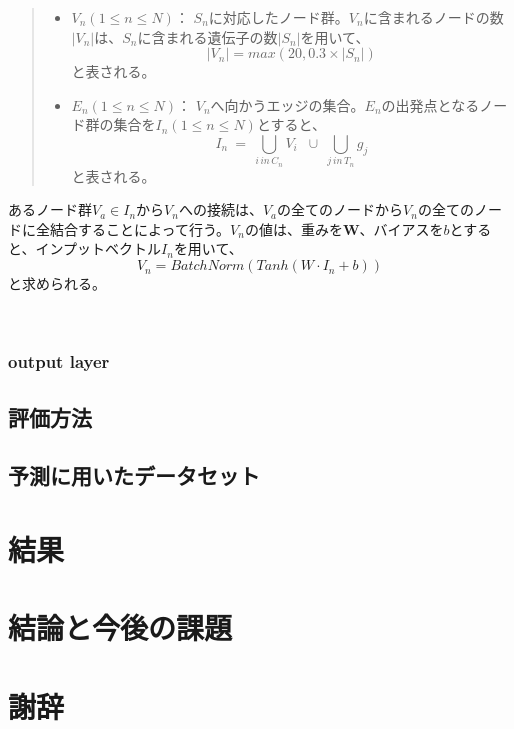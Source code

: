 \documentclass[a4paper,12pt]{jsreport}
\begin{document}
  \begin{quote}
  \begin{itemize}
  \item $V_n(1\leq n\leq N)$： $S_n$に対応したノード群。$V_n$に含まれるノードの数$|V_n|$は、$S_n$に含まれる遺伝子の数$|S_n|$を用いて、$$|V_n| = max(20, 0.3 \times |S_n|)$$と表される。
  \item $E_n(1\leq n\leq N)$： $V_n$へ向かうエッジの集合。$E_n$の出発点となるノード群の集合を$I_n(1\leq n\leq N)$とすると、$$I_n \: = \: \bigcup_{i\, in\, C_n} \! V_i \; \; \cup \;  \bigcup_{j\, in\, T_n} g_j$$と表される。
  \end{itemize}
  \end{quote}
 
 あるノード群$V_a \in I_n$から$V_n$への接続は、$V_a$の全てのノードから$V_n$の全てのノードに全結合することによって行う。$V_n$の値は、重みを$\bm{W}$、バイアスを$b$とすると、インプットベクトル$I_n$を用いて、$$V_n = BatchNorm(Tanh(W \cdot I_n + b))$$と求められる。
  
 
  
  
  
  
  
 
  


 

　




\subsection{output layer}


\section{評価方法}
\section{予測に用いたデータセット}

\chapter{結果}

\chapter{結論と今後の課題}

\chapter{謝辞}
\end{document}
